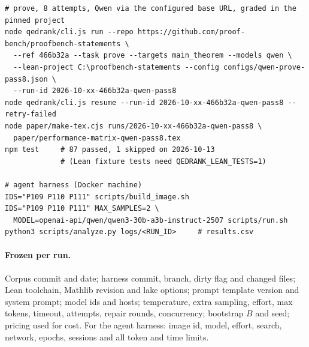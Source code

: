 \documentclass[11pt,a4paper]{article}
\begin{document}
\begin{small}
\begin{verbatim}
# prove, 8 attempts, Qwen via the configured base URL, graded in the pinned project
node qedrank/cli.js run --repo https://github.com/proof-bench/proofbench-statements \
  --ref 466b32a --task prove --targets main_theorem --models qwen \
  --lean-project C:\proofbench-statements --config configs/qwen-prove-pass8.json \
  --run-id 2026-10-xx-466b32a-qwen-pass8
node qedrank/cli.js resume --run-id 2026-10-xx-466b32a-qwen-pass8 --retry-failed
node paper/make-tex.cjs runs/2026-10-xx-466b32a-qwen-pass8 \
  paper/performance-matrix-qwen-pass8.tex
npm test     # 87 passed, 1 skipped on 2026-10-13
             # (Lean fixture tests need QEDRANK_LEAN_TESTS=1)

# agent harness (Docker machine)
IDS="P109 P110 P111" scripts/build_image.sh
IDS="P109 P110 P111" MAX_SAMPLES=2 \
  MODEL=openai-api/qwen/qwen3-30b-a3b-instruct-2507 scripts/run.sh
python3 scripts/analyze.py logs/<RUN_ID>     # results.csv
\end{verbatim}
\end{small}

\paragraph{Frozen per run.} Corpus commit and date; harness commit, branch, dirty flag and changed files; Lean toolchain, Mathlib revision and lake options; prompt template version and system prompt; model ids and hosts; temperature, extra sampling, effort, max tokens, timeout, attempts, repair rounds, concurrency; bootstrap $B$ and seed; pricing used for cost. For the agent harness: image id, model, effort, search, network, epochs, sessions and all token and time limits.
\end{document}
